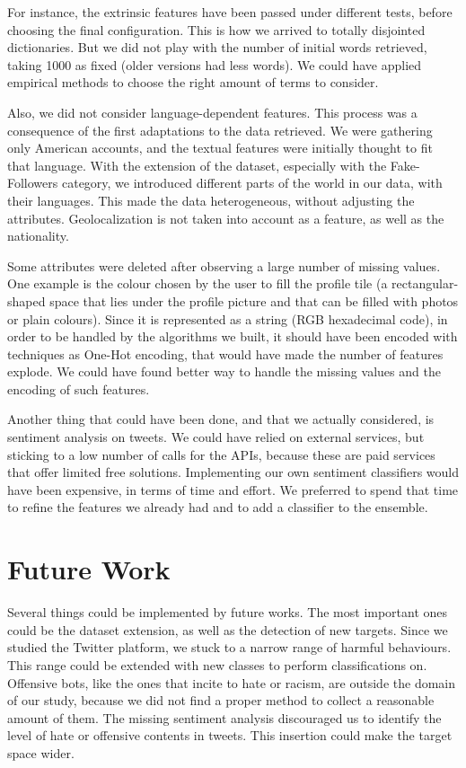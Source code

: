 For instance, the extrinsic features have been passed under different tests, before choosing the final configuration. This is how we arrived to totally disjointed dictionaries. But we did not play with the number of initial words retrieved, taking 1000 as fixed (older versions had less words). We could have applied empirical methods to choose the right amount of terms to consider.

Also, we did not consider language-dependent features. This process was a consequence of the first adaptations to the data retrieved. We were gathering only American accounts, and the textual features were initially thought to fit that language.
With the extension of the dataset, especially with the Fake-Followers category, we introduced different parts of the world in our data, with their languages. This made the data heterogeneous, without adjusting the attributes. Geolocalization is not taken into account as a feature, as well as the nationality. 

Some attributes were deleted after observing a large number of missing values. One example is the colour chosen by the user to fill the profile tile (a rectangular-shaped space that lies under the profile picture and that can be filled with photos or plain colours). Since it is represented as a string (RGB hexadecimal code), in order to be handled by the algorithms we built, it should have been encoded with techniques as One-Hot encoding, that would have made the number of features explode. We could have found better way to handle the missing values and the encoding of such features.

Another thing that could have been done, and that we actually considered, is sentiment analysis on tweets. We could have relied on external services, but sticking to a low number of calls for the APIs, because these are paid services that offer limited free solutions. Implementing our own sentiment classifiers would have been expensive, in terms of time and effort. We preferred to spend that time to refine the features we already had and to add a classifier to the ensemble.

\section{Future Work}
Several things could be implemented by future works. The most important ones could be the dataset extension, as well as the detection of new targets.
Since we studied the Twitter platform, we stuck to a narrow range of harmful behaviours. This range could be extended with new classes to perform classifications on. Offensive bots, like the ones that incite to hate or racism, are outside the domain of our study, because we did not find a proper method to collect a reasonable amount of them. The missing sentiment analysis discouraged us to identify the level of hate or offensive contents in tweets. This insertion could make the target space wider.

